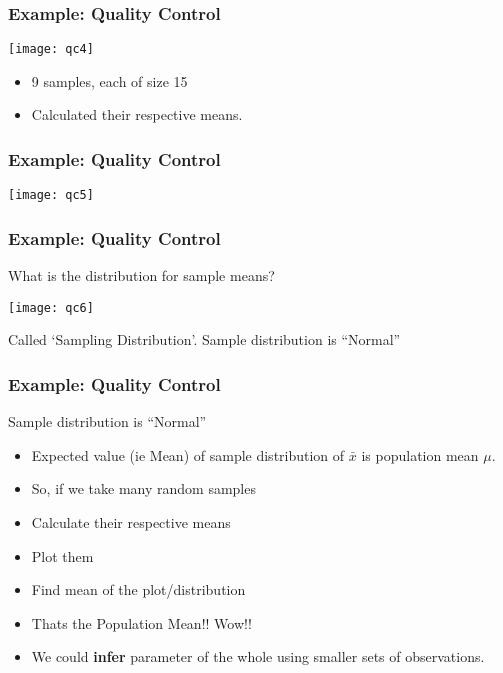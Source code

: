 \begin{frame}[fragile]\frametitle{Example: Quality Control}

\begin{center}
\texttt{[image: qc4]}
\end{center}
\begin{itemize}
\item 9 samples, each of size 15
\item Calculated their respective means.
\end{itemize}
\end{frame}

\begin{frame}[fragile]\frametitle{Example: Quality Control}
\begin{center}
\texttt{[image: qc5]}
\end{center}
\end{frame}

\begin{frame}[fragile]\frametitle{Example: Quality Control}
What is the distribution for sample means?
\begin{center}
\texttt{[image: qc6]}
\end{center}
Called `Sampling Distribution'.
Sample distribution is ``Normal''
\end{frame}

\begin{frame}[fragile]\frametitle{Example: Quality Control}
Sample distribution is ``Normal''
\begin{itemize}
\item Expected value (ie Mean) of sample distribution of $\bar{x}$ is population mean $\mu$.
\item  So, if we take many random samples
\item Calculate their respective means
\item Plot them
\item Find mean of the plot/distribution
\item Thats the Population Mean!!  Wow!!
\item We could {\bf infer} parameter of the whole using smaller sets of observations.
\end{itemize}
\end{frame}


